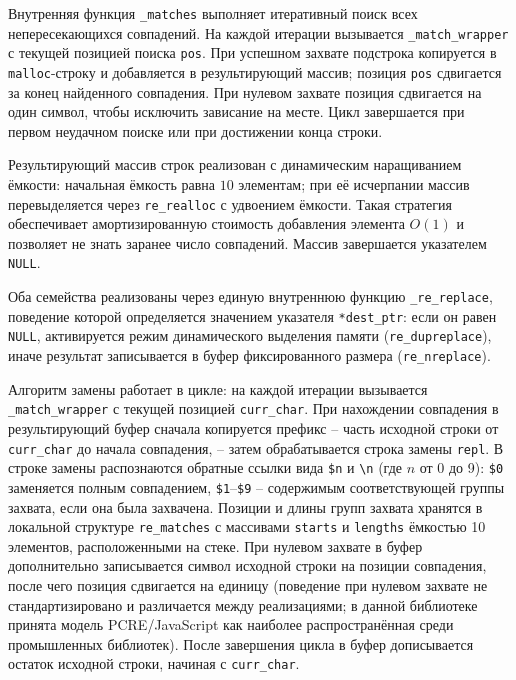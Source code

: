 
Внутренняя функция \verb`_matches` выполняет итеративный поиск всех непересекающихся совпадений. На каждой итерации вызывается \verb`_match_wrapper` с текущей позицией поиска \verb`pos`. При успешном захвате подстрока копируется в \verb`malloc`-строку и добавляется в результирующий массив; позиция \verb`pos` сдвигается за конец найденного совпадения. При нулевом захвате позиция сдвигается на один символ, чтобы исключить зависание на месте. Цикл завершается при первом неудачном поиске или при достижении конца строки.

Результирующий массив строк реализован с динамическим наращиванием ёмкости: начальная ёмкость равна $10$ элементам; при её исчерпании массив перевыделяется через \verb`re_realloc` с удвоением ёмкости. Такая стратегия обеспечивает амортизированную стоимость добавления элемента $O(1)$ и позволяет не знать заранее число совпадений. Массив завершается указателем \verb`NULL`.


Оба семейства реализованы через единую внутреннюю функцию \verb`_re_replace`, поведение которой определяется значением указателя \verb`*dest_ptr`: если он равен \verb`NULL`, активируется режим динамического выделения памяти (\verb`re_dupreplace`), иначе результат записывается в буфер фиксированного размера (\verb`re_nreplace`).

Алгоритм замены работает в цикле: на каждой итерации вызывается \verb`_match_wrapper` с текущей позицией \verb`curr_char`. При нахождении совпадения в результирующий буфер сначала копируется префикс -- часть исходной строки от \verb`curr_char` до начала совпадения, -- затем обрабатывается строка замены \verb`repl`. В строке замены распознаются обратные ссылки вида \verb`$n` и \verb`\n` (где $n$ от 0 до 9): \verb`$0` заменяется полным совпадением, \verb`$1`--\verb`$9` -- содержимым соответствующей группы захвата, если она была захвачена. Позиции и длины групп захвата хранятся в локальной структуре \verb`re_matches` с массивами \verb`starts` и \verb`lengths` ёмкостью 10 элементов, расположенными на стеке. При нулевом захвате в буфер дополнительно записывается символ исходной строки на позиции совпадения, после чего позиция сдвигается на единицу (поведение при нулевом захвате не стандартизировано и различается между реализациями; в данной библиотеке принята модель PCRE/JavaScript как наиболее распространённая среди промышленных библиотек). После завершения цикла в буфер дописывается остаток исходной строки, начиная с \verb`curr_char`.

